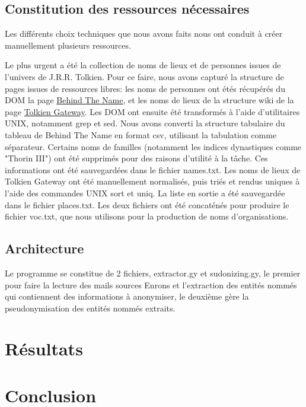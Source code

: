 \documentclass{article}
\begin{document}
\subsection{Constitution des ressources nécessaires}
\par
Les différents choix techniques que nous avons faits nous ont conduit à créer manuellement plusieurs ressources.
\par
Le plus urgent a été la collection de noms de lieux et de personnes issues de l'univers de J.R.R. Tolkien.
Pour ce faire, nous avons capturé la structure de pages issues de ressources libres: les noms de personnes ont étés récupérés du DOM la page \href{https://www.behindthename.com/namesakes/list/tolkien/alpha}{Behind The Name}, et les noms de lieux de la structure wiki de la page \href{http://tolkiengateway.net/w/index.php?title=List_of_Place_Names}{Tolkien Gateway}.
Les DOM ont ensuite été transformés à l'aide d'utilitaires UNIX, notamment grep et sed.
Nous avons converti la structure tabulaire du tableau de Behind The Name en format csv, utilisant la tabulation comme séparateur.
Certains noms de familles (notamment les indices dynastiques comme "Thorin III") ont été supprimés pour des raisons d'utilité à la tâche.
Ces informations ont été sauvegardées dans le fichier names.txt.
Les noms de lieux de Tolkien Gateway ont été manuellement normalisés, puis triés et rendus uniques à l'aide des commandes UNIX sort et uniq.
La liste en sortie a été sauvegardée dans le fichier places.txt.
Les deux fichiers ont été concaténés pour produire le fichier voc.txt, que nous utilisons pour la production de noms d'organisations.

\par

\subsection{Architecture}
Le programme se constitue de 2 fichiers, extractor.gy et sudonizing.gy, le premier pour faire la lecture des mails sources Enrons et l'extraction des entités nommés qui contiennent des informations à anonymiser, le deuxième gère la pseudonymisation des entités nommés extraits. 


\section{Résultats}

\section{Conclusion}
\end{document}
